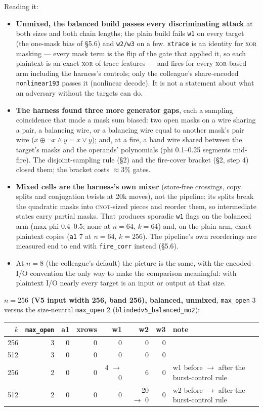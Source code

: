 \documentclass[11pt]{article}
\newcommand{\doc}[1]{\texttt{#1}}
\newcommand{\xor}{\oplus}
\begin{document}
Reading it:
\begin{itemize}
\item \textbf{Unmixed, the balanced build passes every discriminating attack} at
  both sizes and both chain lengths; the plain build fails \doc{w1} on every
  target (the one-mask bias of \S5.6) and \doc{w2/w3} on a few. \doc{xtrace} is an
  identity for \textsc{xor} masking --- every mask term is the flip of the gate
  that applied it, so each plaintext is an exact \textsc{xor} of trace features ---
  and fires for every \textsc{xor}-based arm including the harness's controls;
  only the colleague's share-encoded \doc{nonlinear193} passes it (nonlinear
  decode). It is not a statement about what an adversary without the targets can
  do.
\item \textbf{The harness found three more generator gaps}, each a sampling
  coincidence that made a mask sum biased: two open masks on a wire sharing a
  pair, a balancing wire, or a balancing wire equal to another mask's pair wire
  ($x \xor \neg x{\wedge}y = x\vee y$); and, at a fire, a band wire shared between
  the target's masks and the operands' polynomials (phi 0.1--0.25 segments
  mid-fire). The disjoint-sampling rule (\S2) and the fire-cover bracket (\S2,
  step 4) closed them; the bracket costs ${\approx}3\%$ gates.
\item \textbf{Mixed cells are the harness's own mixer} (store-free crossings, copy
  splits and conjugation twists at 20k moves), not the pipeline: its splits break
  the quadratic masks into \textsc{cnot}-sized pieces and reorder them, so
  intermediate states carry partial masks. That produces sporadic \doc{w1} flags
  on the balanced arm (max phi 0.4--0.5; none at $n=64$, $k=64$) and, on the plain
  arm, exact plaintext copies (\doc{a1} 7 at $n=64$, $k=256$). The pipeline's own
  reorderings are measured end to end with \doc{fire\_corr} instead (\S5.6).
\item At $n=8$ (the colleague's default) the picture is the same, with the
  encoded-I/O convention the only way to make the comparison meaningful: with
  plaintext I/O nearly every target is an input or output at that size.
\end{itemize}

\noindent\textbf{$n=256$ (V5 input width 256, band 256), balanced, unmixed},
\doc{max\_open} 3 versus the size-neutral \doc{max\_open} 2
(\doc{blindedv5\_balanced\_mo2}):

\begin{center}\small
\begin{tabular}{@{}rrrrrrrl@{}}
\toprule
$k$ & \doc{max\_open} & a1 & xrows & w1 & w2 & w3 & note \\
\midrule
256 & 3 & 0 & 0 & 0 & 0 & 0 & \\
512 & 3 & 0 & 0 & 0 & 0 & 0 & \\
256 & 2 & 0 & 0 & 4 $\to$ 0 & 6 & 0 & w1 before $\to$ after the burst-control rule \\
512 & 2 & 0 & 0 & 0 & 20 $\to$ 0 & 0 & w2 before $\to$ after the burst-control rule \\
\bottomrule
\end{tabular}
\end{center}
\end{document}
